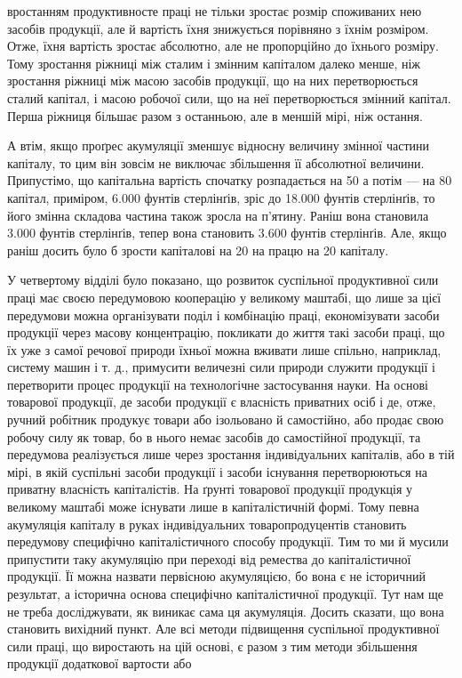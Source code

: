 вростанням продуктивносте праці не тільки зростає розмір споживаних
нею засобів продукції, але й вартість їхня знижується
порівняно з їхнім розміром. Отже, їхня вартість зростає абсолютно,
але не пропорційно до їхнього розміру. Тому зростання
ріжниці між сталим і змінним капіталом далеко менше, ніж зростання
ріжниці між масою засобів продукції, що на них перетворюється
сталий капітал, і масою робочої сили, що на неї перетворюється
змінний капітал. Перша ріжниця більшає разом з останньою,
але в меншій мірі, ніж остання.

А втім, якщо проґрес акумуляції зменшує відносну величину
змінної частини капіталу, то цим він зовсім не виключає збільшення
її абсолютної величини. Припустімо, що капітальна вартість спочатку
розпадається на 50%
а потім — на 80%
капітал, приміром, 6.000 фунтів стерлінґів, зріс до 18.000
фунтів стерлінґів, то його змінна складова частина також зросла
на п’ятину. Раніш вона становила 3.000 фунтів стерлінґів, тепер
вона становить 3.600 фунтів стерлінґів. Але, якщо раніш
досить було б зрости капіталові на 20%
на працю на 20%
капіталу.

У четвертому відділі було показано, що розвиток суспільної
продуктивної сили праці має своєю передумовою кооперацію у
великому маштабі, що лише за цієї передумови можна організувати
поділ і комбінацію праці, економізувати засоби продукції
через масову концентрацію, покликати до життя такі засоби
праці, що їх уже з самої речової природи їхньої можна вживати
лише спільно, наприклад, систему машин і т. д., примусити величезні
сили природи служити продукції і перетворити процес продукції
на технологічне застосування науки. На основі товарової
продукції, де засоби продукції є власність приватних осіб і де,
отже, ручний робітник продукує товари або ізольовано й самостійно,
або продає свою робочу силу як товар, бо в нього немає
засобів до самостійної продукції, та передумова реалізується
лише через зростання індивідуальних капіталів, або в тій мірі,
в якій суспільні засоби продукції і засоби існування перетворюються
на приватну власність капіталістів. На ґрунті товарової
продукції продукція у великому маштабі може існувати лише в
капіталістичній формі. Тому певна акумуляція капіталу в руках
індивідуальних товаропродуцентів становить передумову специфічно
капіталістичного способу продукції. Тим то ми й мусили
припустити таку акумуляцію при переході від ремества до капіталістичної
продукції. Її можна назвати первісною акумуляцією,
бо вона є не історичний результат, а історична основа специфічно
капіталістичної продукції. Тут нам ще не треба досліджувати,
як виникає сама ця акумуляція. Досить сказати, що вона становить
вихідний пункт. Але всі методи підвищення суспільної
продуктивної сили праці, що виростають на цій основі, є разом
з тим методи збільшення продукції додаткової вартости або
